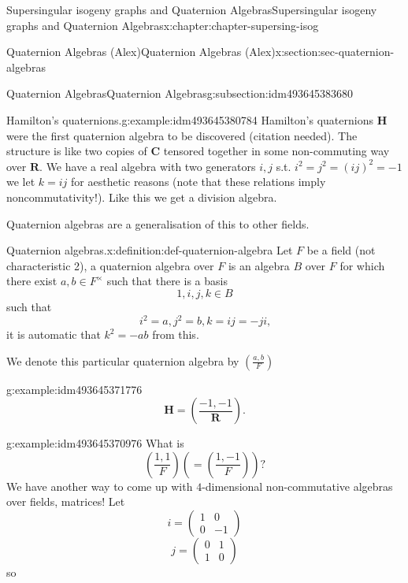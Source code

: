 \documentclass[oneside,10pt,]{book}
\numberwithin{equation}{section}
\newcommand{\legendre}[2]{\left(\frac{#1}{#2}\right)}
\newcommand{\RR}{\mathbf{R}}
\newcommand{\CC}{\mathbf{C}}
\newcommand{\HH}{\mathbf{H}}
\newcommand{\amp}{&}
\begin{document}
\begin{chapterptx}{Supersingular isogeny graphs and Quaternion Algebras}{}{Supersingular isogeny graphs and Quaternion Algebras}{}{}{x:chapter:chapter-supersing-isog}
\begin{sectionptx}{Quaternion Algebras (Alex)}{}{Quaternion Algebras (Alex)}{}{}{x:section:sec-quaternion-algebras}
\begin{subsectionptx}{Quaternion Algebras}{}{Quaternion Algebras}{}{}{g:subsection:idm493645383680}
\begin{introduction}{}
\begin{example}{Hamilton's quaternions.}{g:example:idm493645380784}
Hamilton's quaternions \(\HH\) were the first quaternion algebra to be discovered (citation needed). The structure is like two copies of \(\CC\) tensored together in some non-commuting way over \(\RR\). We have a real algebra with two generators \(i,j\) s.t. \(i^2 = j^2  = (ij)^2 = -1\) we let \(k = ij\) for aesthetic reasons (note that these relations imply noncommutativity!). Like this we get a division algebra.%
\end{example}
Quaternion algebras are a generalisation of this to other fields.%
\begin{definition}{Quaternion algebras.}{x:definition:def-quaternion-algebra}%
Let \(F\) be a field (not characteristic 2), a quaternion algebra over \(F\) is an algebra \(B\) over \(F\) for which there exist \(a,b\in F^\times\) such that there is a basis%
\begin{equation*}
1,i,j,k \in B
\end{equation*}
such that%
\begin{equation*}
i^2 = a,j^2=b,k=ij=-ji\text{,}
\end{equation*}
it is automatic that \(k^2 = -ab\) from this.%
\par
We denote this particular quaternion algebra by \(\legendre{a,b}{F}\)%
\end{definition}
\begin{example}{}{g:example:idm493645371776}%
%
\begin{equation*}
\HH = \legendre{-1,-1}{\RR}\text{.}
\end{equation*}
%
\end{example}
\begin{example}{}{g:example:idm493645370976}%
What is%
\begin{equation*}
\legendre{1,1}{F} \left( = \legendre{1,-1}{F}\right)\text{?}
\end{equation*}
We have another way to come up with \(4\)-dimensional non-commutative algebras over fields, matrices! Let%
\begin{equation*}
i=  \begin{pmatrix} 1\amp0\\0\amp -1\end{pmatrix}
\end{equation*}
%
\begin{equation*}
j =\begin{pmatrix} 0\amp1\\1\amp 0\end{pmatrix}
\end{equation*}
so%
\begin{equation*}

\end{equation*}
\end{example}
\end{introduction}
\end{subsectionptx}
\end{sectionptx}
\end{chapterptx}
\end{document}
